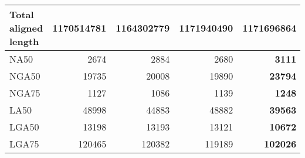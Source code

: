 \documentclass[12pt,a4paper]{article}
\begin{document}
\begin{table}[ht]
\begin{center}
\begin{tabular}{|l*{4}{|r}|}
Total aligned length & 1170514781 & 1164302779 & {\bf 1171940490} & 1171696864 \\ \hline
NA50 & 2674 & 2884 & 2680 & {\bf 3111} \\ \hline
NGA50 & 19735 & 20008 & 19890 & {\bf 23794} \\ \hline
NGA75 & 1127 & 1086 & 1139 & {\bf 1248} \\ \hline
LA50 & 48998 & 44883 & 48882 & {\bf 39563} \\ \hline
LGA50 & 13198 & 13193 & 13121 & {\bf 10672} \\ \hline
LGA75 & 120465 & 120382 & 119189 & {\bf 102026} \\ \hline
\end{tabular}
\end{center}
\end{table}
\end{document}

